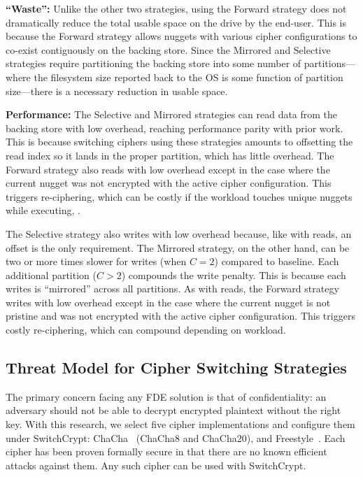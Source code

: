 \textbf{``Waste'':} Unlike the other two strategies, using
the Forward strategy does not dramatically reduce the total usable space on the
drive by the end-user. This is because the Forward strategy allows nuggets with
various cipher configurations to co-exist contiguously on the backing store.
Since the Mirrored and Selective strategies require partitioning the backing
store into some number of partitions---where the filesystem size reported back
to the OS is some function of partition size---there is a necessary reduction in
usable space.

\textbf{Performance:} The Selective and Mirrored strategies can read data
from the backing store with low overhead, reaching performance parity with prior
work. This is because switching ciphers using these strategies amounts to
offsetting the read index so it lands in the proper partition, which has little
overhead. The Forward strategy also reads with low overhead except in the case
where the current nugget was not encrypted with the active cipher configuration.
This triggers re-ciphering, which can be costly if the workload touches unique
nuggets while executing, .

The Selective strategy also writes with low overhead because, like with reads,
an offset is the only requirement. The Mirrored strategy, on the other hand, can
be two or more times slower for writes (when $C = 2$) compared to baseline. Each
additional partition ($C > 2$) compounds the write penalty. This is because each
writes is ``mirrored'' across all partitions. As with reads, the Forward
strategy writes with low overhead except in the case where the current nugget is
not pristine and was not encrypted with the active cipher configuration. This
triggers costly re-ciphering, which can compound depending on workload.

\subsection{Threat Model for Cipher Switching Strategies}

The primary concern facing any FDE solution is that of confidentiality: an
adversary should not be able to decrypt encrypted plaintext without the right
key. With this research, we select five cipher implementations and configure
them under SwitchCrypt: ChaCha~\cite{ChaCha20} (ChaCha8 and ChaCha20), and
Freestyle~\cite{Freestyle}.  Each cipher has been proven formally secure in that
there are no known efficient attacks against them. Any such cipher can be used
with SwitchCrypt.

